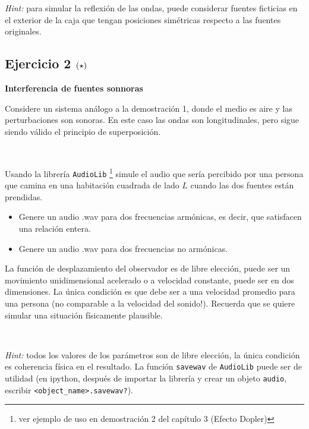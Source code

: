 \textit{Hint:} para simular la reflexión de las ondas, puede considerar 
fuentes ficticias en el exterior de la caja que tengan posiciones simétricas
respecto a las fuentes originales.


\subsection*{Ejercicio 2 \large{$\left( \star \right)$}}

\textbf{Interferencia de fuentes sonnoras}

Considere un sistema análogo a la demostración 1, donde el medio es aire y
las perturbaciones son sonoras. En este caso las ondas son longitudinales,
pero sigue siendo válido el principio de superposición.

\

Usando la librería \texttt{AudioLib} \footnote{ver ejemplo de uso en 
demostración 2 del capítulo 3 (Efecto Dopler)} simule el audio que sería 
percibido por una persona que camina en una habitación cuadrada de lado $L$
cuando las dos fuentes están prendidas. 

\begin{itemize}
\item Genere un audio .wav para dos frecuencias armónicas, es decir, que 
satisfacen una relación entera.
\item Genere un audio .wav para dos frecuencias no armónicas.
\end{itemize}

La función de desplazamiento del observador es de libre elección, puede 
ser un movimiento unidimensional acelerado o a velocidad constante, puede
ser en dos dimensiones. La única condición es que debe ser a una velocidad 
promedio para una persona (no comparable a la velocidad del sonido!). 
Recuerda que se quiere simular una situación físicamente plausible.

\

\textit{Hint:} todos los valores de los parámetros son de libre elección,
la única condición es coherencia física en el resultado. La función 
\texttt{savewav} de \texttt{AudioLib} puede ser de utilidad (en ipython,
después de importar la librería y crear un objeto \texttt{audio}, 
escribir \texttt{<object\_name>.savewav?}).


